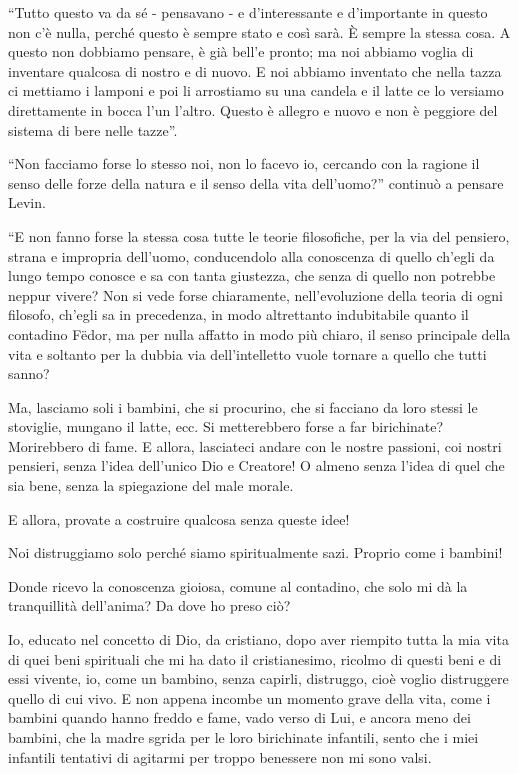 ``Tutto questo va da sé - pensavano - e d'interessante e d'importante in questo non c'è nulla, perché questo è sempre stato e così sarà. È sempre la stessa cosa. A questo non dobbiamo pensare, è già bell'e pronto; ma noi abbiamo voglia di inventare qualcosa di nostro e di nuovo. E noi abbiamo inventato che nella tazza ci mettiamo i lamponi e poi li arrostiamo su una candela e il latte ce lo versiamo direttamente in bocca l'un l'altro. Questo è allegro e nuovo e non è peggiore del sistema di bere nelle tazze''. 

``Non facciamo forse lo stesso noi, non lo facevo io, cercando con la ragione il senso delle forze della natura e il senso della vita dell'uomo?'' continuò a pensare Levin. 

``E non fanno forse la stessa cosa tutte le teorie filosofiche, per la via del pensiero, strana e impropria dell'uomo, conducendolo alla conoscenza di quello ch'egli da lungo tempo conosce e sa con tanta giustezza, che senza di quello non potrebbe neppur vivere? Non si vede forse chiaramente, nell'evoluzione della teoria di ogni filosofo, ch'egli sa in precedenza, in modo altrettanto indubitabile quanto il contadino Fëdor, ma per nulla affatto in modo più chiaro, il senso principale della vita e soltanto per la dubbia via dell'intelletto vuole tornare a quello che tutti sanno? 

Ma, lasciamo soli i bambini, che si procurino, che si facciano da loro stessi le stoviglie, mungano il latte, ecc. Si metterebbero forse a far birichinate? Morirebbero di fame. E allora, lasciateci andare con le nostre passioni, coi nostri pensieri, senza l'idea dell'unico Dio e Creatore! O almeno senza l'idea di quel che sia bene, senza la spiegazione del male morale. 

E allora, provate a costruire qualcosa senza queste idee! 

Noi distruggiamo solo perché siamo spiritualmente sazi. Proprio come i bambini! 

Donde ricevo la conoscenza gioiosa, comune al contadino, che solo mi dà la tranquillità dell'anima? Da dove ho preso ciò? 

Io, educato nel concetto di Dio, da cristiano, dopo aver riempito tutta la mia vita di quei beni spirituali che mi ha dato il cristianesimo, ricolmo di questi beni e di essi vivente, io, come un bambino, senza capirli, distruggo, cioè voglio distruggere quello di cui vivo. E non appena incombe un momento grave della vita, come i bambini quando hanno freddo e fame, vado verso di Lui, e ancora meno dei bambini, che la madre sgrida per le loro birichinate infantili, sento che i miei infantili tentativi di agitarmi per troppo benessere non mi sono valsi. 

